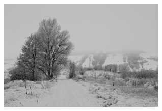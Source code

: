 \vfill

\begin{center}
\includegraphics[keepaspectratio,width=0.6\textwidth]{immagini/blizzard.png}

\end{center}

\pagebreak

